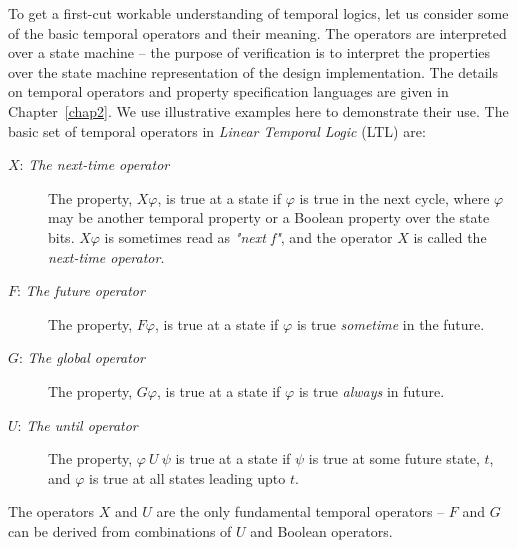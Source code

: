 To get a first-cut workable understanding of temporal logics, let us consider
some of the basic temporal operators and their meaning. The operators are
interpreted over a state machine -- the purpose of verification is to interpret
the properties over the state machine representation of the design
implementation. The details on temporal operators and property specification
languages are given in Chapter~\ref{chap2}. We use illustrative examples
here to demonstrate their use. The basic set of temporal operators in
{\em Linear Temporal Logic} (LTL) are:
\begin{description}

\item[$X$: {\em The next-time operator}] The property, $X\varphi$, is true
	at a state if $\varphi$ 
	is true in the next cycle, where $\varphi$ may be another temporal 
	property or a Boolean property over the state bits. $X\varphi$ is 
	sometimes read as {\em "next f"}, and the operator $X$ is called 
	the {\em next-time operator}.

\item[$F$: {\em The future operator}] The property, $F\varphi$, is true at a
	state if $\varphi$ is true {\em sometime} in the future.

\item[$G$: {\em The global operator}] The property, $G\varphi$, is true at a
	state if $\varphi$ is true {\em always} in future.

\item[$U$: {\em The until operator}] The property, $\varphi\ U\ \psi$ is
	true at a state if $\psi$ is true at some future state, $t$, and 
	$\varphi$ is true at all states leading upto $t$.

\end{description}
The operators $X$ and $U$ are the only fundamental temporal operators -- $F$ 
and $G$ can be derived from combinations of $U$ and Boolean operators.


